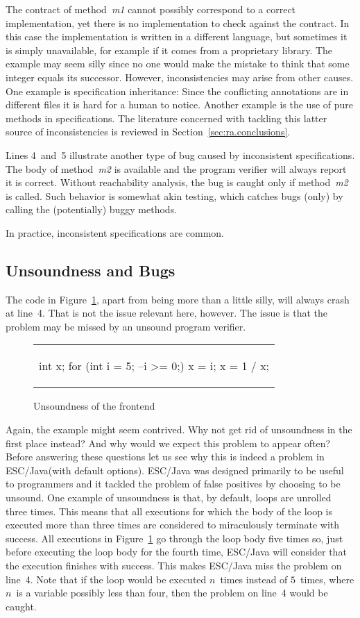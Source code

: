 \documentclass[a4paper]{article}
\newcommand{\escjava}{ESC\slash Java\xspace}
\newcommand{\bc}{\begin{figure}\centering\begin{tabular}{c}} %
\newcommand{\ec}[2]{\end{tabular}\caption{#1}\label{#2}\end{figure}} %
\theoremstyle{slanted}
\theoremstyle{definition}
\theoremstyle{remark}
\begin{document}
The contract of method~\textit{m1} cannot possibly correspond to
a correct implementation, yet there is no implementation to check
against the contract. In this case the implementation is written
in a different language, but sometimes it is simply unavailable,
for example if it comes from a proprietary library. The example
may seem silly since no one would make the mistake to think that
some integer equals its successor. However, inconsistencies
may arise from other causes. One example is specification
inheritance: Since the conflicting annotations are in different
files it is hard for a human to notice. Another example is the
use of pure methods in specifications. The literature concerned
with tackling this latter source of inconsistencies is reviewed
in Section~\ref{sec:ra.conclusions}.

Lines 4~and~5 illustrate another type of bug caused by
inconsistent specifications. The body of method~\textit{m2} is
available and the program verifier will always report it is
correct. Without reachability analysis, the bug is caught only
if method~\textit{m2} is called. Such behavior is somewhat akin
testing, which catches bugs (only) by calling the (potentially)
buggy methods.

In practice, inconsistent specifications are common.

\subsection{Unsoundness and Bugs}

The code in Figure~\ref{fig:ra-loop-unroll}, apart from being
more than a little silly, will always crash at line~4. That is
not the issue relevant here, however. The issue is that the
problem may be missed by an unsound program verifier.

\bc
\begin{jml}
int x;
for (int i = 5; --i >= 0;)
  x = i;
x = 1 / x;
\end{jml}
\ec{Unsoundness of the frontend}{fig:ra-loop-unroll}

Again, the example might seem contrived. Why not get rid of
unsoundness in the first place instead? And why would we expect
this problem to appear often? Before answering these questions
let us see why this is indeed a problem in \escjava (with
default options). \escjava was designed primarily to be useful
to programmers and it tackled the problem of false positives
by choosing to be unsound. One example of unsoundness is that,
by default, loops are unrolled three times. This means that
all executions for which the body of the loop is executed more
than three times are considered to miraculously terminate with
success. All executions in Figure~\ref{fig:ra-loop-unroll} go
through the loop body five times so, just before executing the
loop body for the fourth time, \escjava will consider that the
execution finishes with success. This makes \escjava miss the
problem on line~4. Note that if the loop would be executed
$n$~times instead of $5$~times, where $n$~is a variable possibly
less than four, then the problem on line~4 would be caught.
\end{document}
